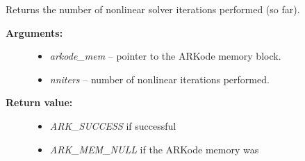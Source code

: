 \documentclass[letterpaper,10pt,english]{sphinxmanual}
\begin{document}

\begin{fulllineitems}
\label{c_interface/User_callable:ARKodeGetNumNonlinSolvIters}
Returns the number of nonlinear solver iterations
performed (so far).
\begin{description}
\item[{\textbf{Arguments:}}] \leavevmode\begin{itemize}
\item {} 
\emph{arkode\_mem} -- pointer to the ARKode memory block.

\item {} 
\emph{nniters} -- number of nonlinear iterations performed.

\end{itemize}

\item[{\textbf{Return value:}}] \leavevmode\begin{itemize}
\item {} 
\emph{ARK\_SUCCESS} if successful

\item {} 
\emph{ARK\_MEM\_NULL} if the ARKode memory was 

\end{itemize}

\end{description}

\end{fulllineitems}

\end{document}
